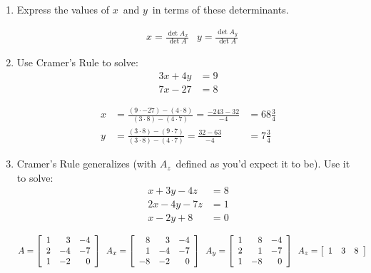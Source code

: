 \documentclass{letter}
\newcommand{\?}{\stackrel{?}{=}}
\newcommand\Que[1]{%
   \leavevmode\noindent
   #1
}
\newcommand\Ans[2][]{%
   \leavevmode\noindent
   {
       \begin{mdframed}[backgroundcolor=blue!10]
       #2
       \end{mdframed}
   }
}
\newenvironment{Mat}[1]{%
  \left[\begin{array}{*{#1}{r}}
}{%
  \end{array}\right]
}
\begin{document}
\begin{enumerate}
\begin{enumerate}[label=(\alph*)]
{    }
    \item \Que{
        Express the values of $x$\ and $y$\ in terms of these determinants.
    }
    \Ans{
    \begin{align*}
        &x = \frac{\det A_x}{\det A}
        &y = \frac{\det A_y}{\det A}
    \end{align*}
       
    }
    \item \Que{
      Use Cramer's Rule to solve:
      \begin{align*}
          3x+4y &= 9 \\
          7x-27 &= 8
      \end{align*}
    }
    \Ans{
      \begin{align*}
        x &= \frac{(9\cdot -27)-(4\cdot 8)}{(3\cdot 8)-(4\cdot 7)} = \frac{-243-32}{-4} &= 68\frac{3}{4}\\
        y &= \frac{(3 \cdot 8)-(9 \cdot 7)}{(3\cdot 8)-(4\cdot 7)} = \frac{32-63}{-4} &= 7\frac{3}{4}
      \end{align*}
    }
    \item \Que{
       Cramer's Rule generalizes (with $A_z$\ defined as you'd expect it to be).  Use it to solve:
       \begin{align*}
            x+3y-4z &= 8 \\
           2x-4y-7z &= 1 \\
            x-2y+8  &= 0
       \end{align*}
    }
    \Ans{
    \begin{align*}
        A  &= \begin{Mat}{3} 1 &  3 & -4 \\ 
                             2 & -4 & -7 \\  
                             1 & -2 &  0 \end{Mat} ~~
        A_x = \begin{Mat}{3} 8 &  3 & -4 \\ 
                             1 & -4 & -7 \\ 
                            -8 & -2 &  0 \end{Mat} ~~
        A_y = \begin{Mat}{3} 1 &  8 & -4 \\ 
                             2 &  1 & -7 \\  
                             1 & -8 &  0 \end{Mat} ~~
        A_z = \begin{Mat}{3} 1 &  3 &  8 \\ 

\end{Mat}
\end{align*}}
\end{enumerate}
\end{enumerate}
\end{document}
